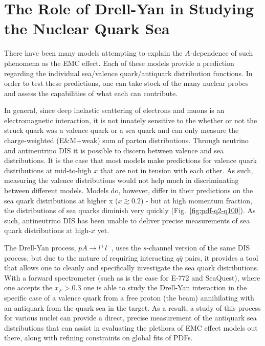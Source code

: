 \section{The Role of Drell-Yan in Studying the Nuclear Quark Sea}

There have been many models attempting to explain the $A$-dependence of such phenomena as the EMC effect. Each of these models provide a prediction regarding the individual sea/valence quark/antiquark distribution functions. In order to test these predictions, one can take stock of the many nuclear probes and assess the capabilities of what each can contribute.

In general, since deep inelastic scattering of electrons and muons is an electromagnetic interaction, it is not innately sensitive to the whether or not the struck quark was a valence quark or a sea quark and can only measure the charge-weighted (E\&M+weak) sum of parton distributions. Through neutrino and antineutrino DIS it is possible to discern between valence and sea distributions. It is the case that most models make predictions for valence quark distributions at mid-to-high $x$ that are not in tension with each other. As such, measuring the valence distributions would not help much in discriminating between different models. Models do, however, differ in their predictions on the sea quark distributions at higher x ($x\gtrsim0.2$) - but at high momentum fraction, the distributions of sea quarks diminish very quickly (Fig.~\ref{fig:pdf-q2-q100}). As such, antineutrino DIS has been unable to deliver precise measurements of sea quark distributions at high-$x$ yet.

The Drell-Yan process, $pA\rightarrow l^+l^-$, uses the $s$-channel version of the same DIS process, but due to the nature of requiring interacting $q\bar{q}$ pairs, it provides a tool that allows one to cleanly and specifically investigate the sea quark distributions. With a forward spectrometer (such as is the case for E-772 and SeaQuest), where one accepts the $x_F>0.3$ one is able to study the Drell-Yan interaction in the specific case of a valence quark from a free proton (the beam) annihilating with an antiquark from the quark sea in the target. As a result, a study of this process for various nuclei can provide a direct, precise measurement of the antiquark sea distributions that can assist in evaluating the plethora of EMC effect models out there, along with refining constraints on global fits of PDFs.

